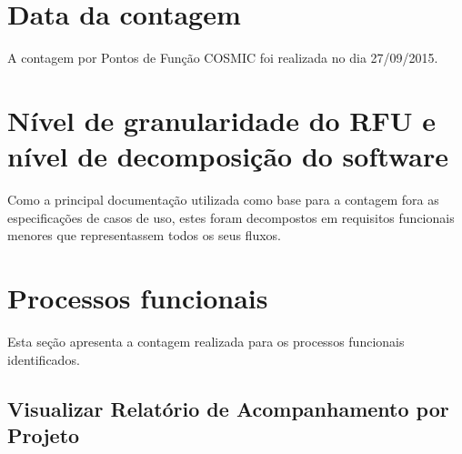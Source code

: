 \section{Data da contagem}

  A contagem por Pontos de Função COSMIC foi realizada no dia 27/09/2015.


\section{Nível de granularidade do RFU e nível de decomposição do software}
  
   Como a principal documentação utilizada como base para a contagem fora as especificações de casos de uso, 
   estes foram decompostos em requisitos funcionais menores que representassem todos os seus fluxos.
  
\section{Processos funcionais}
  
  Esta seção apresenta a contagem realizada para os processos funcionais identificados.
  
  \subsection{Visualizar Relatório de Acompanhamento por Projeto}
  
